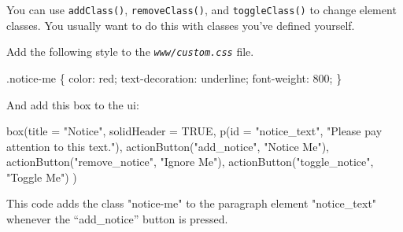 \documentclass[
  oneside]{book}
\newenvironment{Shaded}{\begin{snugshade}}{\end{snugshade}}
\newcommand{\AttributeTok}[1]{\textcolor[rgb]{0.77,0.63,0.00}{#1}}
\newcommand{\ConstantTok}[1]{\textcolor[rgb]{0.00,0.00,0.00}{#1}}
\newcommand{\DecValTok}[1]{\textcolor[rgb]{0.00,0.00,0.81}{#1}}
\newcommand{\FunctionTok}[1]{\textcolor[rgb]{0.00,0.00,0.00}{#1}}
\newcommand{\NormalTok}[1]{#1}
\newcommand{\SpecialCharTok}[1]{\textcolor[rgb]{0.00,0.00,0.00}{#1}}
\newcommand{\StringTok}[1]{\textcolor[rgb]{0.31,0.60,0.02}{#1}}
\begin{document}
You can use \texttt{addClass}\texttt{()}, \texttt{removeClass}\texttt{()}, and \texttt{toggleClass}\texttt{()} to change element classes. You usually want to do this with classes you've defined yourself.

Add the following style to the \textit{\texttt{www/custom.css}} file.

\begin{Shaded}
\begin{Highlighting}[]
\NormalTok{.notice}\SpecialCharTok{{-}}\NormalTok{me \{}
\NormalTok{  color}\SpecialCharTok{:}\NormalTok{ red;}
\NormalTok{  text}\SpecialCharTok{{-}}\NormalTok{decoration}\SpecialCharTok{:}\NormalTok{ underline;}
\NormalTok{  font}\SpecialCharTok{{-}}\NormalTok{weight}\SpecialCharTok{:} \DecValTok{800}\NormalTok{;}
\NormalTok{\}}
\end{Highlighting}
\end{Shaded}

And add this box to the ui:

\begin{Shaded}
\begin{Highlighting}[]
\FunctionTok{box}\NormalTok{(}\AttributeTok{title =} \StringTok{"Notice"}\NormalTok{, }\AttributeTok{solidHeader =} \ConstantTok{TRUE}\NormalTok{,}
    \FunctionTok{p}\NormalTok{(}\AttributeTok{id =} \StringTok{"notice\_text"}\NormalTok{, }\StringTok{"Please pay attention to this text."}\NormalTok{),}
    \FunctionTok{actionButton}\NormalTok{(}\StringTok{"add\_notice"}\NormalTok{, }\StringTok{"Notice Me"}\NormalTok{),}
    \FunctionTok{actionButton}\NormalTok{(}\StringTok{"remove\_notice"}\NormalTok{, }\StringTok{"Ignore Me"}\NormalTok{),}
    \FunctionTok{actionButton}\NormalTok{(}\StringTok{"toggle\_notice"}\NormalTok{, }\StringTok{"Toggle Me"}\NormalTok{)}
\NormalTok{)}
\end{Highlighting}
\end{Shaded}

This code adds the class \StringTok{"notice-me"} to the paragraph element \StringTok{"notice\_text"} whenever the ``add\_notice'' button is pressed.

\begin{Shaded}
\end{Shaded}
\end{document}
